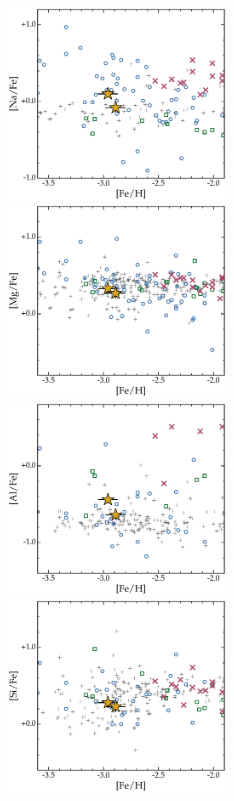 \documentclass[twocolumn,tighten]{aastex62}
\begin{document}
\begin{figure}
\begin{center}
\includegraphics[angle=0,width=2.27in]{fig3a.pdf}
\hspace*{0.02in}
\includegraphics[angle=0,width=2.27in]{fig3b.pdf} 
\hspace*{0.02in}
\includegraphics[angle=0,width=2.27in]{fig3c.pdf} \\
\vspace*{-0.231in}
\includegraphics[angle=0,width=2.27in]{fig3d.pdf}
\hspace*{0.02in}

\end{center}
\end{figure}
\end{document}
